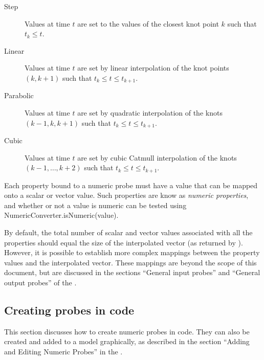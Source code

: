 \begin{description}

\item[Step]\mbox{}

Values at time $t$ are set to the values of the closest knot point
$k$ such that $t_k \le t$.

\item[Linear]\mbox{}

Values at time $t$ are set by linear interpolation of the knot points
$(k, k+1)$ such that $t_k \le t \le t_{k+1}$.

\item[Parabolic]\mbox{}

Values at time $t$ are set by quadratic interpolation of the knots
$(k-1, k, k+1)$ such that $t_k \le t \le t_{k+1}$.

\item[Cubic]\mbox{}

Values at time $t$ are set by cubic Catmull interpolation of the knots
$(k-1, \ldots, k+2)$ such that $t_k \le t \le t_{k+1}$.

\end{description}

Each property bound to a numeric probe must have a value
that can be mapped onto a scalar or vector value. Such properties
are know as {\it numeric properties}, and whether or not
a value is numeric can be tested using\pdfbreak
{}%
{NumericConverter.isNumeric(value)}.

By default, the total number of scalar and vector values associated
with all the properties should equal the size of the interpolated
vector (as returned by
).
However, it is possible to establish more complex mappings between the
property values and the interpolated vector. These mappings are beyond
the scope of this document, but are discussed in the sections ``General
input probes'' and ``General output probes'' of the
.

\subsection{Creating probes in code}

This section discusses how to create numeric probes in code.  They can
also be created and added to a model graphically, as described in the
section ``Adding and Editing Numeric Probes'' in the
.

